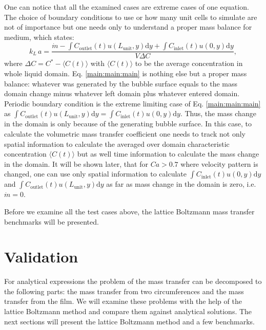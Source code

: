 \documentclass{article}
\newcommand{\beq}{\begin{equation}}
\newcommand{\feq}{\end{equation}}
\newcommand{\vol}{k_L\,a}
\newcommand{\lunit}{L_{\mathrm{unit}}}
\newcommand{\cinlet}{C_{\mathrm{inlet}}}
\newcommand{\coutlet}{C_{\mathrm{outlet}}}
\newcommand{\cstar}{C^{*}}
\begin{document}
One can notice that all the examined cases are extreme cases of one equation. The choice of boundary
conditions to use  or how many unit cells to simulate are not of importance but one needs only to
understand a proper mass balance for medium, which states:
\beq
\label{main:main:main}
\vol=\frac{\dot{m}-\int{\coutlet(t) u(\lunit,y)\mathrm{d}y}+\int{\cinlet(t) u(0,y)\mathrm{d}y}}{V
\Delta C}, 
\feq
where $\Delta C=\cstar-\langle C(t) \rangle$ with $\langle C(t) \rangle$ to be the average
concentration in whole liquid domain. Eq. \ref{main:main:main} is nothing else but a proper mass
balance: whatever was generated by the bubble surface equals to the mass domain change minus
whatever left domain plus whatever entered domain. Periodic boundary condition is the extreme
limiting case of Eq. \ref{main:main:main} as $\int{\coutlet(t)
u(\lunit,y)\mathrm{d}y}=\int{\cinlet(t) u(0,y)\mathrm{d}y}$. Thus, the mass change in the domain is
only because of the generating bubble surface. In this case, to calculate the volumetric mass
transfer coefficient one needs to track not only spatial information to calculate the averaged over
domain characteristic concentration  $\langle C(t) \rangle$ but as well time information to
calculate the mass change in the domain. It will be shown later, that for $Ca>0.7$ where velocity
pattern is changed, one can use only spatial information to calculate $\int{\cinlet(t) u(0,y)
\mathrm{d}y}$ and $\int{\coutlet(t) u(\lunit,y)\mathrm{d}y}$ as far as mass change in the domain is
zero, i.e. $\dot{m}=0$.

Before we examine all the test cases above, the lattice Boltzmann mass transfer
benchmarks will be presented. 

\section{Validation}
For analytical expressions the problem of the mass transfer can be decomposed to the following
parts: the mass transfer from two circumferences and the mass transfer from the film. We will
examine
these problems with the help of the lattice Boltzmann method and compare them against analytical
solutions. The next sections will present the lattice Boltzmann method and a few benchmarks.
\end{document}
